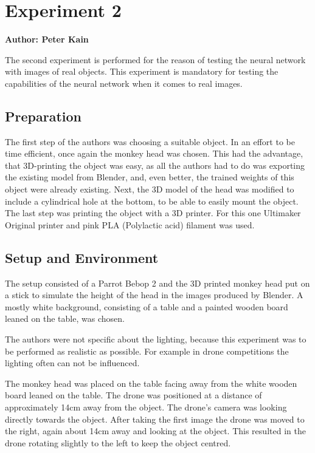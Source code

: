 \chapter{Experiment 2}

\textbf{Author: Peter Kain} 

The second experiment is performed for the reason of testing the neural network with images of real objects. This experiment is mandatory for testing the capabilities of the neural network when it comes to real images.

\section{Preparation}
The first step of the authors was choosing a suitable object. In an effort to be time efficient, once again the monkey head was chosen. This had the advantage, that 3D-printing the object was easy, as all the authors had to do was exporting the existing model from Blender, and, even better, the trained weights of this object were already existing. Next, the 3D model of the head was modified to include a cylindrical hole at the bottom, to be able to easily mount the object. The last step was printing the object with a 3D printer. For this one Ultimaker Original printer and pink PLA (Polylactic acid) filament was used.

\section{Setup and Environment}
The setup consisted of a Parrot Bebop 2 and the 3D printed monkey head put on a stick to simulate the height of the head in the images produced by Blender. A mostly white background, consisting of a table and a painted wooden board leaned on the table, was chosen.

The authors were not specific about the lighting, because this experiment was to be performed as realistic as possible. For example in drone competitions the lighting often can not be influenced.

The monkey head was placed on the table facing away from the white wooden board leaned on the table. The drone was positioned at a distance of approximately 14cm away from the object. The drone's camera was looking directly towards the object. After taking the first image the drone was moved to the right, again about 14cm away and looking at the object. This resulted in the drone rotating slightly to the left to keep the object centred.

